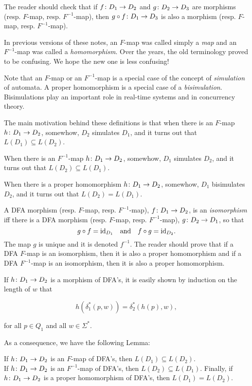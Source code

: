\medskip
The reader should check that if
$f\colon D_1\rightarrow D_2$ and 
$g\colon D_2\rightarrow D_3$ are
morphisms (resp. $F$-map, resp. 
$F^{-1}$-map), then
$g\circ f\colon D_1\rightarrow D_3$ is also a morphism 
(resp. $F$-map, resp. $F^{-1}$-map).


\remark
In previous versions of these notes, an $F$-map was called simply a 
{\it  map\/} and
an $F^{-1}$-map was called a {\it  homomorphism\/}.
Over the years, the old terminology proved to be confusing.
We hope the new one is less confusing!

\medskip
Note that an $F$-map or an  $F^{-1}$-map is a special case
of the concept of {\it  simulation\/} of automata.
A proper homomorphism is a special case of a
{\it  bisimulation\/}. Bisimulations play an important role
in real-time systems and in concurrency theory.

\medskip
The main motivation behind these definitions is that
when there is an $F$-map $h\colon D_1\rightarrow D_2$, somewhow,
$D_2$ simulates $D_1$, and it turns out that
$L(D_1) \subseteq L(D_2)$.

\medskip
When there is an $F^{-1}$-map $h\colon D_1\rightarrow D_2$, somewhow,
$D_1$ simulates $D_2$, and it turns out that
$L(D_2) \subseteq L(D_1)$.

\medskip
When there is a proper homomorphism $h\colon D_1\rightarrow D_2$, somewhow,
$D_1$ bisimulates $D_2$, and it turns out that
$L(D_2) = L(D_1)$.

\medskip
A DFA morphism (resp. $F$-map, resp. $F^{-1}$-map), 
$f\colon D_1\rightarrow D_2$,
is an {\it  isomorphism\/} iff there is a DFA morphism (resp. $F$-map,
resp. $F^{-1}$-map), $g\colon D_2\rightarrow D_1$, so that
\[
g\circ  f = {\rm id}_{D_1}
\quad\hbox{and}\quad
f\circ g = {\rm id}_{D_2}.
\]
The map $g$ is unique and it is denoted $f^{-1}$.
The reader should prove that if a DFA $F$-map 
is an isomorphism, then it is also a proper homomorphism
and if a DFA $F^{-1}$-map is an isomorphism, then it is also
a proper homomorphism.

\medskip
If $h\colon D_1\rightarrow D_2$  is a morphism
of DFA's, it is easily shown by 
induction on the length of $w$ that

\[h(\delta_1^*(p, w)) = \delta_2^*(h(p), w),\]

\medskip
for all $p\in Q_1$ and all $w\in \Sigma^*$.

\medskip
As a consequence, we have the following Lemma:


\begin{lemma}
\label{DFAmaplem1}
If $h\colon D_1\rightarrow D_2$  is an $F$-map of DFA's, then
$L(D_1) \subseteq L(D_2)$. \\
If $h\colon D_1\rightarrow D_2$  is an $F^{-1}$-map of DFA's, then
$L(D_2) \subseteq L(D_1)$.
Finally, if $h\colon D_1\rightarrow D_2$  is a proper homomorphism of DFA's, then 
$L(D_1) = L(D_2)$.
\end{lemma}

